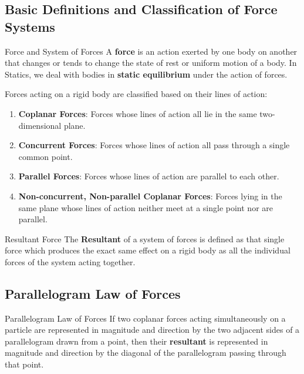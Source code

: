 \documentclass[11pt,a4paper]{article}
\begin{document}
\subsection{Basic Definitions and Classification of Force Systems}

\begin{definitionbox}{Force and System of Forces}
A \textbf{force} is an action exerted by one body on another that changes or tends to change the state of rest or uniform motion of a body. In Statics, we deal with bodies in \textbf{static equilibrium} under the action of forces.

Forces acting on a rigid body are classified based on their lines of action:
\begin{enumerate}
    \item \textbf{Coplanar Forces}: Forces whose lines of action all lie in the same two-dimensional plane.
    \item \textbf{Concurrent Forces}: Forces whose lines of action all pass through a single common point.
    \item \textbf{Parallel Forces}: Forces whose lines of action are parallel to each other.
    \item \textbf{Non-concurrent, Non-parallel Coplanar Forces}: Forces lying in the same plane whose lines of action neither meet at a single point nor are parallel.
\end{enumerate}
\end{definitionbox}

\begin{definitionbox}{Resultant Force}
The \textbf{Resultant} of a system of forces is defined as that single force which produces the exact same effect on a rigid body as all the individual forces of the system acting together.
\end{definitionbox}

\subsection{Parallelogram Law of Forces}

\begin{theorembox}{Parallelogram Law of Forces}
If two coplanar forces acting simultaneously on a particle are represented in magnitude and direction by the two adjacent sides of a parallelogram drawn from a point, then their \textbf{resultant} is represented in magnitude and direction by the diagonal of the parallelogram passing through that point.
\end{theorembox}
\end{document}
